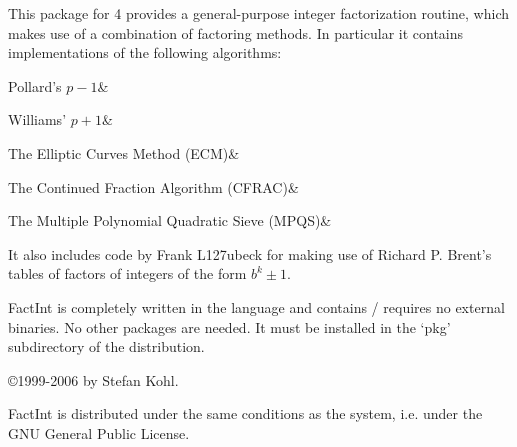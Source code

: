 
This package for {\GAP} 4 provides a general-purpose integer
factorization routine, which makes use of a combination of factoring
methods. In particular it contains implementations of the following
algorithms:

\beginitems
Pollard's $p-1$&

Williams' $p+1$&

The Elliptic Curves Method (ECM)&

The Continued Fraction Algorithm (CFRAC)&

The Multiple Polynomial Quadratic Sieve (MPQS)&
\enditems

It also includes code by Frank L\accent127ubeck for making use of
Richard P. Brent's tables of factors of integers of the form $b^k \pm 1$.

{\sf FactInt} is completely written in the {\GAP} language and contains /
requires no external binaries. No other packages are needed.
It must be installed in the `pkg' subdirectory of the
{\GAP} distribution.

\vfill

\copyright 1999-2006 by Stefan Kohl.

{\sf FactInt} is distributed under the same conditions as the {\GAP}
system, i.e. under the GNU General Public License.

